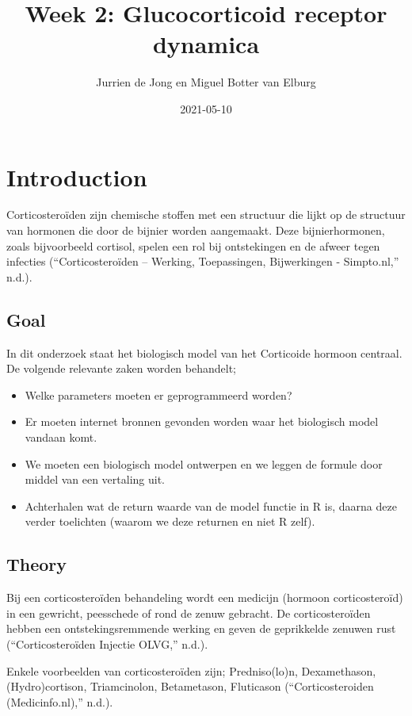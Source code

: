\documentclass[
]{article}
\title{Week 2: Glucocorticoid receptor dynamica}
\author{Jurrien de Jong en Miguel Botter van Elburg}
\date{2021-05-10}
\providecommand{\tightlist}{%
  \setlength{\itemsep}{0pt}\setlength{\parskip}{0pt}}
\begin{document}
\maketitle

\hypertarget{introduction}{%
\section{Introduction}\label{introduction}}

Corticosteroïden zijn chemische stoffen met een structuur die lijkt op
de structuur van hormonen die door de bijnier worden aangemaakt. Deze
bijnierhormonen, zoals bijvoorbeeld cortisol, spelen een rol bij
ontstekingen en de afweer tegen infecties ({``Corticosteroïden --
Werking, Toepassingen, Bijwerkingen - Simpto.nl,''} n.d.).

\hypertarget{goal}{%
\subsection{Goal}\label{goal}}

In dit onderzoek staat het biologisch model van het Corticoide hormoon
centraal. De volgende relevante zaken worden behandelt;

\begin{itemize}
\tightlist
\item
  Welke parameters moeten er geprogrammeerd worden?
\item
  Er moeten internet bronnen gevonden worden waar het biologisch model
  vandaan komt.
\item
  We moeten een biologisch model ontwerpen en we leggen de formule door
  middel van een vertaling uit.
\item
  Achterhalen wat de return waarde van de model functie in R is, daarna
  deze verder toelichten (waarom we deze returnen en niet R zelf).
\end{itemize}

\hypertarget{theory}{%
\subsection{Theory}\label{theory}}

Bij een corticosteroïden behandeling wordt een medicijn (hormoon
corticosteroïd) in een gewricht, peesschede of rond de zenuw gebracht.
De corticosteroïden hebben een ontstekingsremmende werking en geven de
geprikkelde zenuwen rust ({``Corticosteroïden Injectie \textbar{}
OLVG,''} n.d.).

Enkele voorbeelden van corticosteroïden zijn; Predniso(lo)n,
Dexamethason, (Hydro)cortison, Triamcinolon, Betametason, Fluticason
({``Corticosteroiden (Medicinfo.nl),''} n.d.).
\end{document}
